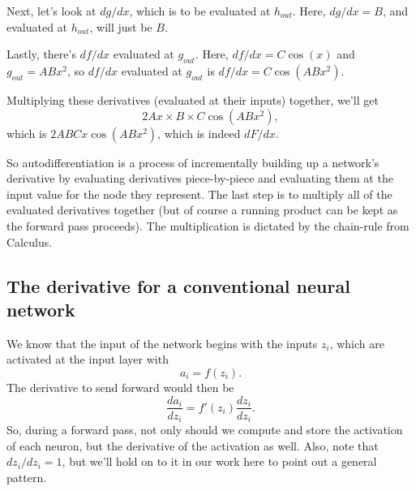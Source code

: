 \documentclass[12pt]{article}
\begin{document}
Next, let's look at $dg/dx$, which is to be evaluated at $h_{out}$.  Here, $dg/dx=B$, and evaluated at $h_{out}$, will just be $B$.

Lastly, there's $df/dx$ evaluated at $g_{out}$.  Here, $df/dx=C\cos(x)$ and $g_{out}=ABx^2$, so $df/dx$ evaluated at $g_{out}$ is $df/dx=C\cos(ABx^2)$.

Multiplying these derivatives (evaluated at their inputs) together, we'll get
\begin{equation}
2Ax\times B \times C\cos(ABx^2),
\end{equation}
which is $2ABCx\cos(ABx^2)$, which is indeed $dF/dx$.

So autodifferentiation is a process of incrementally building up a network's derivative by evaluating derivatives piece-by-piece and evaluating them at the input value for the node they represent.  The last step is to multiply all of the evaluated derivatives together (but of course a running product can be kept as the forward pass proceeds). The multiplication is dictated by the chain-rule from Calculus.

\subsection{The derivative for a conventional neural network}












We know that the input of the network begins with the inputs $z_i$, which are activated at the input layer with
\begin{equation}
a_i=f(z_i).
\end{equation}
The derivative to send forward would then be
\begin{equation}
\label{pattern_start}
\frac{da_i}{dz_i}=f'(z_i)\frac{dz_i}{dz_i}.
\end{equation}
So, during a forward pass, not only should we compute and store the activation of each neuron, but the derivative of the activation as well.  Also, note that $dz_i/dz_i=1$, but we'll hold on to it in our work here to point out a general pattern.
\end{document}
